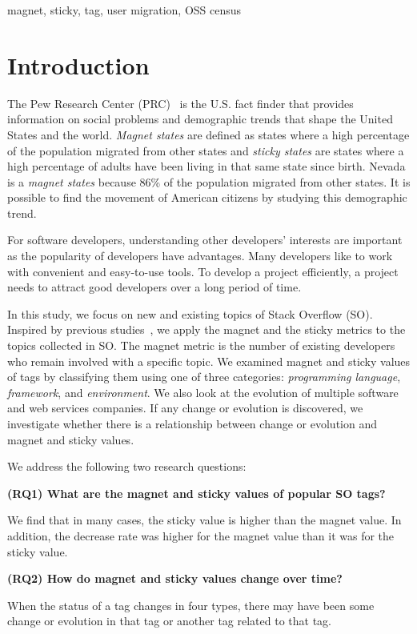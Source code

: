 \documentclass[conference]{IEEEtran}
\begin{document}
\begin{IEEEkeywords}
magnet, sticky, tag, user migration, OSS census
\end{IEEEkeywords}

\section{Introduction}
The Pew Research Center (PRC)~\cite{communityeconomic} is the U.S. fact finder that provides information on social problems and demographic trends that shape the United States and the world.  
\emph{Magnet states} are defined as states where a high percentage of the population migrated from other states and \emph{sticky states} are states where a high percentage of adults have been living in that same state since birth. 
Nevada is a \emph{magnet states} because  86\% of the population migrated from other states. It is possible to find the movement of American citizens by studying this demographic trend.

For software developers, understanding other developers' interests are important as the popularity of developers have advantages. Many developers like to work with convenient and easy-to-use tools. To develop a project efficiently, a project needs to attract good developers over a long period of time.

In this study, we focus on new and existing topics of Stack Overflow (SO). Inspired by previous studies~\cite{yamashita2016magnet}, we apply the magnet and the sticky metrics to the topics collected in SO. 
The magnet metric is the number of existing developers who remain involved with a specific topic.
We examined magnet and sticky values of tags by classifying them using one of three categories: \emph{programming language}, \emph{framework}, and \emph{environment}. We also look at the evolution of multiple software and web services companies. If any change or evolution is discovered, we investigate whether there is a relationship between change or evolution and magnet and sticky values.

We address the following two research questions:

\noindent \textbf{(RQ1) What are the magnet and sticky values of popular SO tags?}\par
We find that in many cases, the sticky value is higher than the magnet value. In addition, the decrease rate was higher for the magnet value than it was for the sticky value.

\noindent \textbf{(RQ2) How do magnet and sticky values change over time?}\par
When the status of a tag changes in four types, there may have been some change or evolution in that tag or another tag related to that tag.
\end{document}
